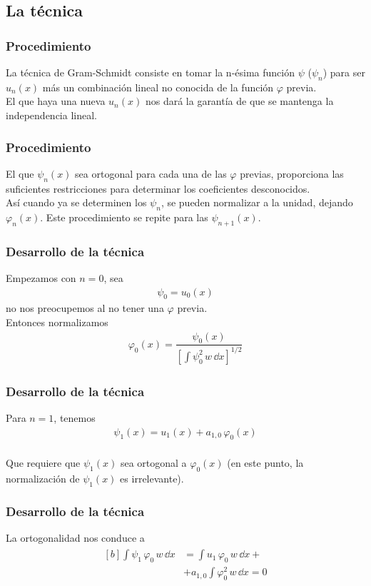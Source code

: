 \subsection{La técnica}
\begin{frame}
\frametitle{Procedimiento}
La técnica de Gram-Schmidt consiste en tomar la n-ésima función $\psi$ ($\psi_{n}$) para ser $u_{n}(x)$ más un combinación lineal no conocida de la función $\varphi$ previa.
\\
\bigskip
El que haya una nueva $u_{n}(x)$ nos dará la garantía de que se mantenga la independencia lineal.
\end{frame}
\begin{frame}
\frametitle{Procedimiento}
El que $\psi_{n}(x)$ sea ortogonal para cada una de las $\varphi$ previas, proporciona las suficientes restricciones para determinar los coeficientes desconocidos.
\\
\bigskip
\pause
Así cuando ya se determinen los $\psi_{n}$, se pueden normalizar a la unidad, dejando $\varphi_{n}(x)$. Este procedimiento se repite para las $\psi_{n+1}(x)$.
\end{frame}
\begin{frame}
\frametitle{Desarrollo de la técnica}
Empezamos con $n = 0$, sea
\begin{align}
\psi_{0} = u_{0}(x)
\label{eq:ecuacion_10_41}
\end{align}
no nos preocupemos al no tener una $\varphi$ previa.
\\
\bigskip
\pause
Entonces normalizamos
\begin{align}
\varphi_{0}(x) = \dfrac{\psi_{0}(x)}{\left[ \displaystyle \int \psi_{0}^{2} \, w \, \dd{x} \right]^{1/2}}
\label{eq:ecuacion_10_42}
\end{align}
\end{frame}
\begin{frame}
\frametitle{Desarrollo de la técnica}
Para $n = 1$, tenemos
\begin{align}
\psi_{1}(x) = u_{1}(x) + a_{1,0} \, \varphi_{0}(x)
\label{eq:ecuacion_10_43}
\end{align}
\\
\bigskip
\pause
Que requiere que $\psi_{1}(x)$ sea ortogonal a $\varphi_{0}(x)$ (en este punto, la normalización de $\psi_{1}(x)$ es irrelevante).
\end{frame}
\begin{frame}
\frametitle{Desarrollo de la técnica}
La ortogonalidad nos conduce a
\begin{align}
\begin{aligned}[b]
\int \psi_{1} \, \varphi_{0} \, w \, \dd{x} &= \int u_{1} \, \varphi_{0} \, w \, \dd{x} + \\
&+ a_{1,0} \int \varphi_{0}^{2} \, w \,  \dd{x} = 0
\end{aligned}
\label{eq:ecuacion_10_44}
\end{align}
\end{frame}
